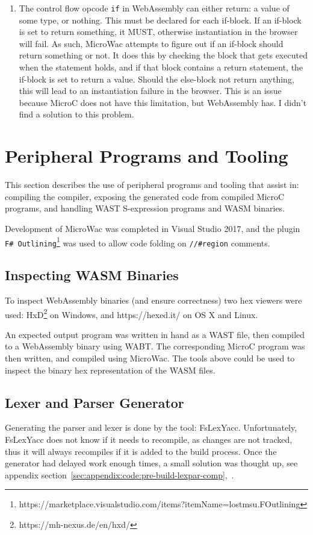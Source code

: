 \documentclass[a4paper]{article}
\begin{document}
\begin{enumerate}
	\item The control flow opcode \texttt{if} in WebAssembly can either return: a value of some type, or nothing. This must be declared for each if-block. If an if-block is set to return something, it MUST, otherwise instantiation in the browser will fail. As such, MicroWac attempts to figure out if an if-block should return something or not. It does this by checking the block that gets executed when the statement holds, and if that block contains a return statement, the if-block is set to return a value. Should the else-block not return anything, this will lead to an instantiation failure in the browser. This is an issue because MicroC does not have this limitation, but WebAssembly has. I didn't find a solution to this problem.
\end{enumerate}

\newpage
\section{Peripheral Programs and Tooling}
\label{sec:peripherals}
This section describes the use of peripheral programs and tooling that assist in: compiling the compiler, exposing the generated code from compiled MicroC programs, and handling WAST S-expression programs and WASM binaries.

Development of MicroWac was completed in Visual Studio 2017, and the plugin \texttt{F\# Outlining}\footnote{https://marketplace.visualstudio.com/items?itemName=lostmsu.FOutlining} was used to allow code folding on \texttt{//\#region} comments.

\subsection{Inspecting WASM Binaries}
\label{sec:peripherals:inspecting-wasm}
To inspect WebAssembly binaries (and ensure correctness) two hex viewers were used: HxD\footnote{https://mh-nexus.de/en/hxd/} on Windows, and https://hexed.it/ on OS X and Linux.

An expected output program was written in hand as a WAST file, then compiled to a WebAssembly binary using WABT. The corresponding MicroC program was then written, and compiled using MicroWac. The tools above could be used to inspect the binary hex representation of the WASM files.

\subsection{Lexer and Parser Generator}
\label{sec:peripherals:lexpargen}
Generating the parser and lexer is done by the tool: FsLexYacc. Unfortunately, FsLexYacc does not know if it needs to recompile, as changes are not tracked, thus it will always recompiles if it is added to the build process. Once the generator had delayed work enough times, a small solution was thought up, see appendix section~\ref{sec:appendix:code:pre-build-lexpar-comp},~.
\end{document}
